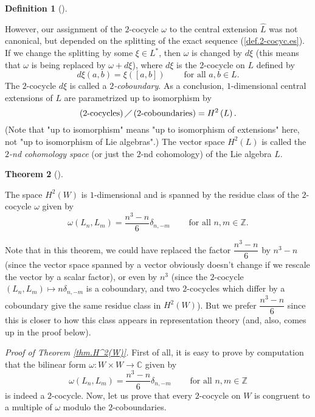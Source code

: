 \documentclass
[numbers=enddot,12pt,final,onecolumn,german,notitlepage]{scrartcl}%
\theoremstyle{definition}
\newtheorem{theo}{Theorem}
\newenvironment{theorem}[1][]
{\begin{theo}[#1]\begin{leftbar}}
{\end{leftbar}\end{theo}}
\newtheorem{defi}[theo]{Definition}
\newenvironment{definition}[1][]
{\begin{defi}[#1]\begin{leftbar}}
{\end{leftbar}\end{defi}}
\begin{document}
\begin{definition}
However, our assignment of the $2$-cocycle $\omega$ to the central extension
$\widehat{L}$ was not canonical, but depended on the splitting of the exact
sequence (\ref{def.2-cocyc.es}). If we change the splitting by some $\xi\in
L^{\ast}$, then $\omega$ is changed by $d\xi$ (this means that $\omega$ is
being replaced by $\omega+d\xi$), where $d\xi$ is the $2$-cocycle on $L$
defined by
\[
d\xi\left(  a,b\right)  =\xi\left(  \left[  a,b\right]  \right)
\ \ \ \ \ \ \ \ \ \ \text{for all }a,b\in L.
\]
The $2$-cocycle $d\xi$ is called a $2$\textit{-coboundary}. As a conclusion,
$1$-dimensional central extensions of $L$ are parametrized up to isomorphism
by%
\[
\left(  2\text{-cocycles}\right)  \diagup\left(  2\text{-coboundaries}\right)
=H^{2}\left(  L\right)  .
\]
(Note that "up to isomorphism" means "up to isomorphism of extensions" here,
not "up to isomorphism of Lie algebras".) The vector space $H^{2}\left(
L\right)  $ is called the $2$\textit{-nd cohomology space} (or just the $2$-nd
cohomology) of the Lie algebra $L$.
\end{definition}

\begin{theorem}
\label{thm.H^2(W)}The space $H^{2}\left(  W\right)  $ is $1$-dimensional and
is spanned by the residue class of the $2$-cocycle $\omega$ given by%
\[
\omega\left(  L_{n},L_{m}\right)  =\dfrac{n^{3}-n}{6}\delta_{n,-m}%
\ \ \ \ \ \ \ \ \ \ \text{for all }n,m\in\mathbb{Z}.
\]

\end{theorem}

Note that in this theorem, we could have replaced the factor $\dfrac{n^{3}%
-n}{6}$ by $n^{3}-n$ (since the vector space spanned by a vector obviously
doesn't change if we rescale the vector by a scalar factor), or even by
$n^{3}$ (since the $2$-cocycle $\left(  L_{n},L_{m}\right)  \mapsto
n\delta_{n,-m}$ is a coboundary, and two $2$-cocycles which differ by a
coboundary give the same residue class in $H^{2}\left(  W\right)  $). But we
prefer $\dfrac{n^{3}-n}{6}$ since this is closer to how this class appears in
representation theory (and, also, comes up in the proof below).

\textit{Proof of Theorem \ref{thm.H^2(W)}.} First of all, it is easy to prove
by computation that the bilinear form $\omega:W\times W\rightarrow\mathbb{C}$
given by%
\[
\omega\left(  L_{n},L_{m}\right)  =\dfrac{n^{3}-n}{6}\delta_{n,-m}%
\ \ \ \ \ \ \ \ \ \ \text{for all }n,m\in\mathbb{Z}%
\]
is indeed a $2$-cocycle. Now, let us prove that every $2$-cocycle on $W$ is
congruent to a multiple of $\omega$ modulo the $2$-coboundaries.
\end{document}
